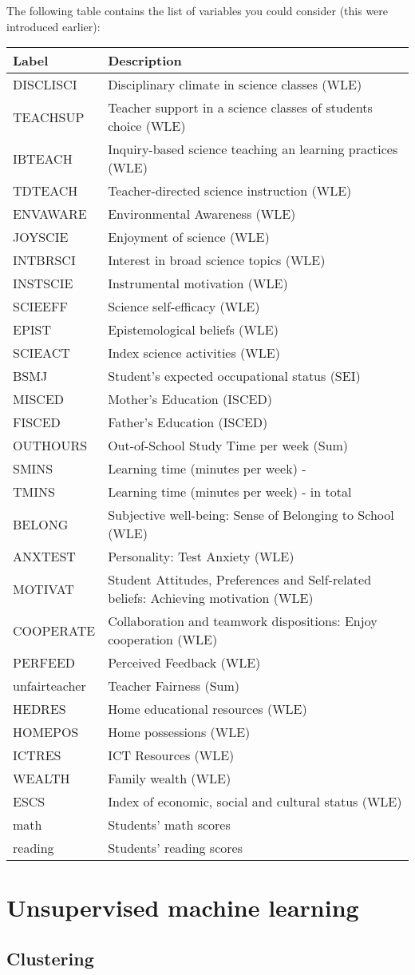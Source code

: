 \documentclass[
]{book}
\begin{document}
The following table contains the list of variables you could consider (this were introduced earlier):

\begin{longtable}[]{@{}ll@{}}
\toprule
Label & Description\tabularnewline
\midrule
\endhead
DISCLISCI & Disciplinary climate in science classes (WLE)\tabularnewline
TEACHSUP & Teacher support in a science classes of students choice (WLE)\tabularnewline
IBTEACH & Inquiry-based science teaching an learning practices (WLE)\tabularnewline
TDTEACH & Teacher-directed science instruction (WLE)\tabularnewline
ENVAWARE & Environmental Awareness (WLE)\tabularnewline
JOYSCIE & Enjoyment of science (WLE)\tabularnewline
INTBRSCI & Interest in broad science topics (WLE)\tabularnewline
INSTSCIE & Instrumental motivation (WLE)\tabularnewline
SCIEEFF & Science self-efficacy (WLE)\tabularnewline
EPIST & Epistemological beliefs (WLE)\tabularnewline
SCIEACT & Index science activities (WLE)\tabularnewline
BSMJ & Student's expected occupational status (SEI)\tabularnewline
MISCED & Mother's Education (ISCED)\tabularnewline
FISCED & Father's Education (ISCED)\tabularnewline
OUTHOURS & Out-of-School Study Time per week (Sum)\tabularnewline
SMINS & Learning time (minutes per week) - \tabularnewline
TMINS & Learning time (minutes per week) - in total\tabularnewline
BELONG & Subjective well-being: Sense of Belonging to School (WLE)\tabularnewline
ANXTEST & Personality: Test Anxiety (WLE)\tabularnewline
MOTIVAT & Student Attitudes, Preferences and Self-related beliefs: Achieving motivation (WLE)\tabularnewline
COOPERATE & Collaboration and teamwork dispositions: Enjoy cooperation (WLE)\tabularnewline
PERFEED & Perceived Feedback (WLE)\tabularnewline
unfairteacher & Teacher Fairness (Sum)\tabularnewline
HEDRES & Home educational resources (WLE)\tabularnewline
HOMEPOS & Home possessions (WLE)\tabularnewline
ICTRES & ICT Resources (WLE)\tabularnewline
WEALTH & Family wealth (WLE)\tabularnewline
ESCS & Index of economic, social and cultural status (WLE)\tabularnewline
math & Students' math scores\tabularnewline
reading & Students' reading scores\tabularnewline
\bottomrule
\end{longtable}

\hypertarget{unsupervised-machine-learning}{%
\chapter{Unsupervised machine learning}\label{unsupervised-machine-learning}}

\hypertarget{clustering}{%
\section{Clustering}\label{clustering}}
\end{document}
